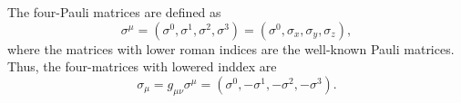 \begin{remark}
  The four-Pauli matrices are defined as
  \begin{equation}
    \sigma^{\mu} = (\sigma^0, \sigma^1, \sigma^2, \sigma^{3}) = (\sigma^0, \sigma_x, \sigma_y, \sigma_z),
  \end{equation}
  where the matrices with lower roman indices are the well-known Pauli matrices.
  Thus, the four-matrices with lowered inddex are
  \begin{equation}
    \sigma_{\mu} = g_{\mu \nu} \sigma^{\mu} = (\sigma^0, -\sigma^1, -\sigma^2, -\sigma^{3}).
  \end{equation}
\end{remark}
